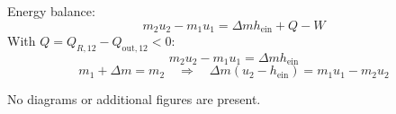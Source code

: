 Energy balance:  
\[
m_2 u_2 - m_1 u_1 = \Delta m h_{\text{ein}} + Q - W
\]  
With \( Q = Q_{R,12} - Q_{\text{out},12} < 0 \):  
\[
m_2 u_2 - m_1 u_1 = \Delta m h_{\text{ein}}
\]  
\[
m_1 + \Delta m = m_2 \quad \Rightarrow \quad \Delta m (u_2 - h_{\text{ein}}) = m_1 u_1 - m_2 u_2
\]  

No diagrams or additional figures are present.
